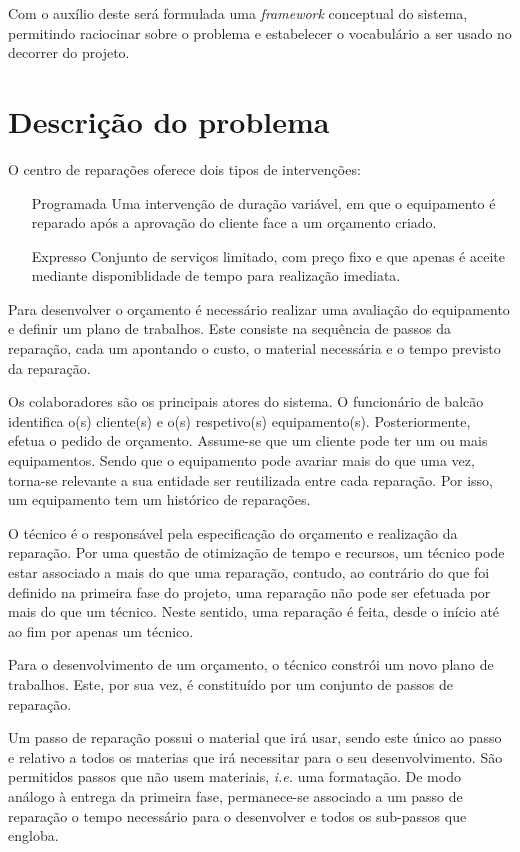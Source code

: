 \documentclass[a4paper,12pt]{scrreprt}
\begin{document}
Com o auxílio deste será formulada uma \textit{framework} conceptual do sistema, permitindo raciocinar sobre o problema e estabelecer o 
vocabulário a ser usado no decorrer do projeto.

\section{Descrição do problema}
O centro de reparações oferece dois tipos de intervenções:
\begin{itemize}
    \item[Programada]{Uma intervenção de duração variável, em que o equipamento é reparado após a aprovação do cliente face a um orçamento criado.}
    \item[Expresso]{Conjunto de serviços limitado, com preço fixo e 
                    que apenas é aceite mediante disponiblidade de tempo para realização imediata.
                   }
\end{itemize}

Para desenvolver o orçamento é necessário realizar uma avaliação do equipamento e definir um plano de trabalhos. 
Este consiste na sequência de passos da reparação, cada um apontando o custo, o material necessária e o tempo 
previsto da reparação.

Os colaboradores são os principais atores do sistema. 
O funcionário de balcão identifica o(s) cliente(s) e o(s) respetivo(s) equipamento(s). Posteriormente, efetua o pedido de orçamento.
Assume-se que um cliente pode ter um ou mais equipamentos.
Sendo que o equipamento pode avariar mais do que uma vez, torna-se relevante a sua entidade ser reutilizada entre cada reparação.
Por isso, um equipamento tem um histórico de reparações.

O técnico é o responsável pela especificação do orçamento e realização da reparação.
Por uma questão de otimização de tempo e recursos, um técnico pode estar associado a mais do que uma reparação, contudo, ao
contrário do que foi definido na primeira fase do projeto, uma reparação não pode ser efetuada por mais do que um técnico.
Neste sentido, uma reparação é feita, desde o início até ao fim por apenas um técnico. 

Para o desenvolvimento de um orçamento, o técnico constrói um novo plano de trabalhos.
Este, por sua vez, é constituído por um conjunto de passos de reparação.

Um passo de reparação possui o material que irá usar, sendo este único ao passo e relativo a todos os materias 
que irá necessitar para o seu desenvolvimento. São permitidos passos que não usem materiais, \textit{i.e.} uma formatação. 
De modo análogo à entrega da primeira fase, permanece-se associado a um passo de reparação o tempo necessário para o desenvolver 
e todos os sub-passos que engloba.
\end{document}
